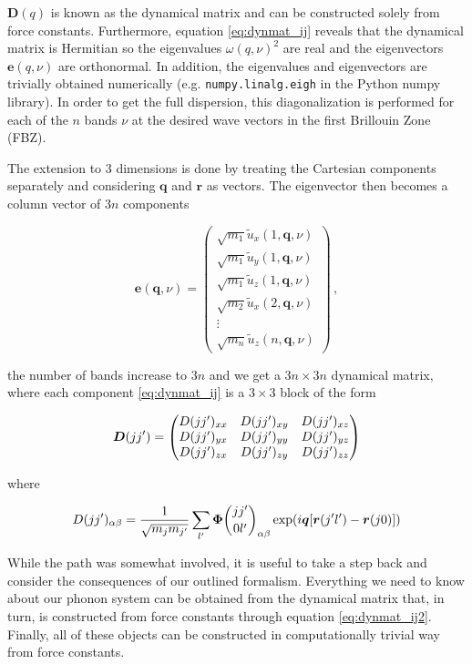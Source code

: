 \noindent $\bm{D}(q)$ is known as the dynamical matrix and can be constructed solely from force constants. Furthermore, equation \eqref{eq:dynmat_ij} reveals that the dynamical matrix is Hermitian so the eigenvalues $\omega(q,\nu)^2$ are real and the eigenvectors $\bm{e}(q, \nu)$ are orthonormal. In addition, the eigenvalues and eigenvectors are trivially obtained numerically (e.g. \texttt{numpy.linalg.eigh} in the Python numpy library). In order to get the full dispersion, this diagonalization is performed for each of the $n$ bands $\nu$ at the desired wave vectors in the first Brillouin Zone (FBZ). 

The extension to 3 dimensions is done by treating the Cartesian components separately and considering $\bm{q}$ and $\bm{r}$ as vectors. The eigenvector then becomes a column vector of $3n$ components 

\[ \bm{e}(\bm{q},\nu) = \begin{pmatrix}
\sqrt{m_1}\tilde{u}_x(1,\bm{q},\nu) \\
\sqrt{m_1}\tilde{u}_y(1,\bm{q},\nu) \\
\sqrt{m_1}\tilde{u}_z(1,\bm{q},\nu) \\
\sqrt{m_2}\tilde{u}_x(2,\bm{q},\nu) \\
\vdots \\
\sqrt{m_{n}}\tilde{u}_z(n,\bm{q},\nu)
\end{pmatrix} \, , \]

\noindent the number of bands increase to $3n$ and we get a $3n \times 3n$ dynamical matrix, where each component \eqref{eq:dynmat_ij} is a $3 \times 3$ block of the form

\[
\bm{D}(jj^\prime) = \begin{pmatrix}
D(jj^\prime)_{xx} & D(jj^\prime)_{xy} & D(jj^\prime)_{xz} \\
D(jj^\prime)_{yx} & D(jj^\prime)_{yy} & D(jj^\prime)_{yz} \\
D(jj^\prime)_{zx} & D(jj^\prime)_{zy} & D(jj^\prime)_{zz}
\end{pmatrix}
\]

\noindent where

\begin{equation}
D(j\jp)_{\alpha\beta} = \frac{1}{\sqrt{m_j m_{\jp}}} \sum_{\lp} \fczero _{\alpha\beta} \exp (i\bm{q}[\bm{r}(\jp\lp) - \bm{r}(j0)]) \label{eq:dynmat_ij2}
\end{equation}

\noindent While the path was somewhat involved, it is useful to take a step back and consider the consequences of our outlined formalism. Everything we need to know about our phonon system can be obtained from the dynamical matrix that, in turn,  is constructed from force constants through equation \eqref{eq:dynmat_ij2}. Finally, all of these objects can be constructed in computationally trivial way from force constants.

